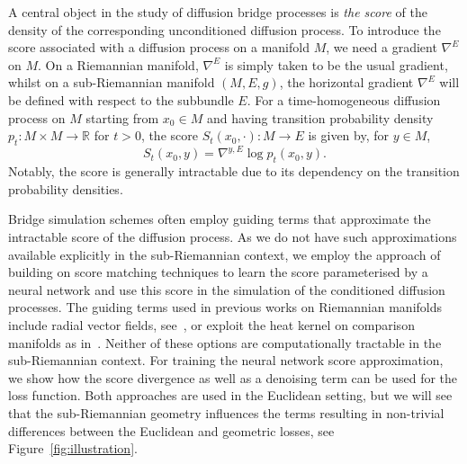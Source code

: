 \documentclass[10pt]{amsart}
\theoremstyle{remark}
\newcommand{\R}{\mathbb{R}}
\numberwithin{equation}{section}
\begin{document}
A central object in the study of diffusion bridge processes is \emph{the score} of the density of the corresponding unconditioned diffusion process. To introduce the score associated with a diffusion process on a manifold $M$, we need a gradient $\nabla^E$ on $M$. On a Riemannian manifold, $\nabla^E$ is simply taken to be the usual gradient, whilst on a sub-Riemannian manifold $(M,E,g)$, the horizontal gradient $\nabla^E$ will be defined with respect to the subbundle $E$.
For a time-homogeneous diffusion process on $M$ starting from $x_0\in M$ and having transition probability density $p_t\colon M\times M\to\R$ for $t>0$, the score $S_t(x_0,\cdot)\colon M\to E$ is given by, for $y\in M$,
\begin{equation} \label{eq:score}
S_t(x_0,y) = \nabla^{y,E} \log p_t(x_0, y).
\end{equation}
Notably, the score is generally intractable due to its dependency on the transition probability densities.


Bridge simulation schemes often employ guiding terms that approximate the intractable score of the diffusion process. As we do not have such approximations available explicitly in the sub-Riemannian context, we employ the approach of \cite{HdBDT21} building on score matching techniques \cite{hyvarinenEstimationNonNormalizedStatistical2005,vincentConnectionScoreMatching2011} to learn the score parameterised by a neural network and use this score in the simulation of the conditioned diffusion processes. The guiding terms used in previous works on Riemannian manifolds include radial vector fields, see~\cite{JS21,buiInferencePartiallyObserved2023}, or exploit the heat kernel on comparison manifolds as in~\cite{corstanjeSimulatingConditionedDiffusions2024}. Neither of these options are computationally tractable in the sub-Riemannian context. For training the neural network score approximation, we show how the score divergence as well as a denoising term can be used for the loss function. Both approaches are used in the Euclidean setting, but we will see that the sub-Riemannian geometry influences the terms resulting in non-trivial differences between the Euclidean and geometric losses, see Figure~\ref{fig:illustration}.
\end{document}
